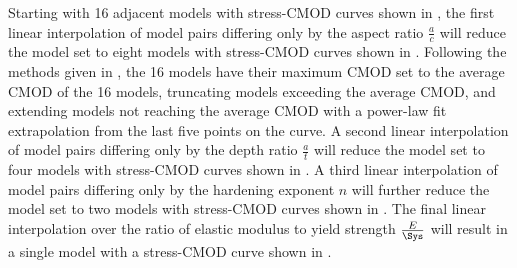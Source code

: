 \newcommand{\icurve}[1]{\raisebox{-.5\height}{\texttt{[image: \#1]}}}%
Starting with 16 adjacent models with stress-CMOD curves shown in , the first linear interpolation of model pairs differing only by the aspect ratio $\frac{a}{c}$ will reduce the model set to eight models with stress-CMOD curves shown in .
Following the methods given in \citet{allenwells2014}, the 16 models have their maximum CMOD set to the average CMOD of the 16 models, truncating models exceeding the average CMOD, and extending models not reaching the average CMOD with a power-law fit extrapolation from the last five points on the curve.
A second linear interpolation of model pairs differing only by the depth ratio $\frac{a}{t}$ will reduce the model set to four models with stress-CMOD curves shown in .
A third linear interpolation of model pairs differing only by the hardening exponent $n$ will further reduce the model set to two models with stress-CMOD curves shown in .
The final linear interpolation over the ratio of elastic modulus to yield strength $\frac{E}{\Sys}$ will result in a single model with a stress-CMOD curve shown in .
